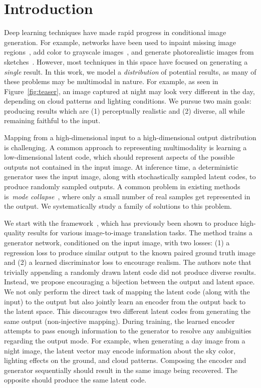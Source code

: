 \section{Introduction}
Deep learning techniques have made rapid progress in conditional image generation. For example, networks have been used to inpaint missing image regions~\citep{pathakCVPR16context,yang2016high,isola2016image}, 
add color to grayscale images~\citep{iizuka2016let,larsson2016learning,zhang2016colorful,isola2016image}, and generate photorealistic images from sketches~\cite{sangkloy2017scribbler,isola2016image}.
However, most techniques in this space have focused on generating a \textit{single} result.
In this work, we model a \textit{distribution} of potential results, as many of these problems may be multimodal in nature. For example,
as seen in Figure~\ref{fig:teaser}, an image captured at night may look very different in the day, depending on cloud patterns and lighting conditions.
We pursue two main goals: producing results which are (1) perceptually realistic and (2) diverse, all while remaining faithful to the input.

Mapping from a high-dimensional input to a high-dimensional output distribution is challenging. A common approach to representing multimodality is learning a low-dimensional latent code, which should represent aspects of the possible outputs not contained in the input image. At inference time, a deterministic generator uses the input image, along with stochastically sampled latent codes, to produce randomly sampled outputs. A common problem in existing methods is~\textit{mode collapse}~\citep{goodfellow2016nips}, where only a small number of real samples get represented in the output.
We systematically study a family of solutions to this problem.

We start with the \pp framework~\citep{isola2016image}, which has previously been shown to produce high-quality results for various image-to-image translation tasks. The method trains a generator network, conditioned on the input image, with two losses: (1) a regression loss to produce similar output to the known paired ground truth image and (2) a learned discriminator loss to encourage realism. The authors note that trivially appending a randomly drawn latent code did not produce diverse results. Instead, we propose encouraging a bijection between the output and latent space. 
We not only perform the direct task of mapping the latent code (along with the input) to the output but also jointly learn an encoder from the output back to the latent space. 
This discourages two different latent codes from generating the same output (non-injective mapping).
During training, the learned encoder attempts to pass enough information to the generator to resolve any ambiguities regarding the output mode.
For example, when generating a day image from a night image, the latent vector may encode information about the sky color, lighting effects on the ground, and cloud patterns.  Composing the encoder and generator sequentially should result in the same image being recovered. The opposite should produce the same latent code.

